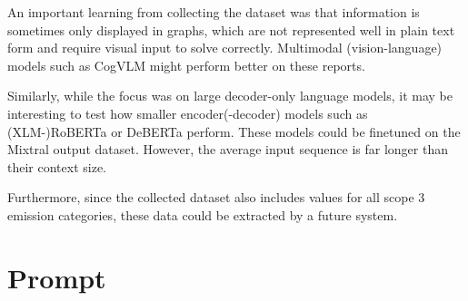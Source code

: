 \documentclass[]{article}
\begin{document}
An important learning from collecting the dataset was that information is sometimes only displayed in graphs, which are not represented well in plain text form and require visual input to solve correctly. Multimodal (vision-language) models such as CogVLM \cite{DBLP:journals/corr/abs-2311-03079} might perform better on these reports.

Similarly, while the focus was on large decoder-only language models, it may be interesting to test how smaller encoder(-decoder) models such as (XLM-)RoBERTa or DeBERTa perform. These models could be finetuned on the Mixtral output dataset. However, the average input sequence is far longer than their context size.

Furthermore, since the collected dataset also includes values for all scope 3 emission categories, these data could be extracted by a future system.

\clearpage
\appendix
\section{Prompt}





\end{document}
